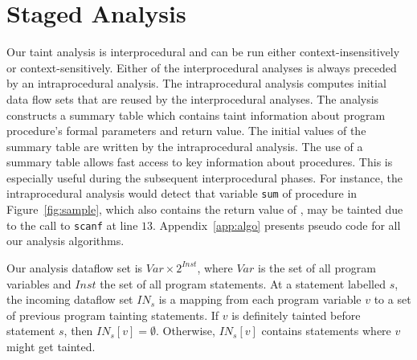 \section{Staged Analysis}\label{sec:analysis}

\newcommand{\varset}{\mathit{Var}}
\newcommand{\instset}{\mathit{Inst}}
\newcommand{\procset}{\mathit{Proc}}
\newcommand{\formalsset}{\mathit{formals}}
\newcommand{\firstfunc}{\mathit{first}}
\newcommand{\toplevelfunc}{\mathit{toplevel}}
\newcommand{\pointsto}[2]{{pt}_{[#1]}(#2)}
\newcommand{\pointstobefore}[2]{{pt}_{[\overline{#1}]	}(#2)}
\newcommand{\pointstoafter}[2]{{pt}_{[\underline{#1}]}(#2)}

\newcommand{\myinflow}{\mathit{IN}}
\newcommand{\myoutflow}{\mathit{OUT}}
\newcommand{\ifff}{\mathit{iff}}
\newcommand{\aand}{\mathit{and}}
\newcommand{\mybigcup}[2]{\mathlarger{\bigcup_{#1}^{#2}}}

Our taint analysis is interprocedural and can be run
either context-insensitively or context-sensitively.
Either of the interprocedural analyses is always preceded
by an intraprocedural analysis. The intraprocedural analysis
computes initial data flow sets that are reused by the
interprocedural analyses.
The analysis constructs a summary table which contains
taint information about program procedure's formal
parameters and return value.
The initial values of the summary table are written by
the intraprocedural analysis. The use of a summary table
allows fast access to key information about procedures.
This is especially useful during the subsequent interprocedural
phases.
For instance, the intraprocedural analysis would
detect that variable \texttt{sum} of procedure \compute{} in
Figure~\ref{fig:sample}, which also contains the return
value of \compute{}, may be tainted due to the call
to \texttt{scanf} at line $13$.
Appendix~\ref{app:algo} presents pseudo code for all
our analysis algorithms.

Our analysis dataflow set is $\varset \times 2^\instset$,
where $\varset$ is the set of all program variables and
$\instset$ the set of all program statements. 
At a statement labelled $s$, the incoming dataflow set $\myinflow_s$
is a mapping from each program variable $v$ to a set of
previous program tainting statements.
If $v$ is definitely tainted before statement $s$, then
$\myinflow_s[v] = \emptyset$. Otherwise, $\myinflow_s[v]$
contains statements where $v$ might get tainted.

